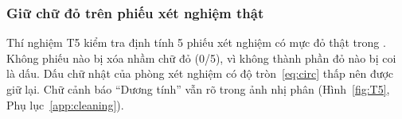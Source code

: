 \subsubsection{Giữ chữ đỏ trên phiếu xét nghiệm thật}
Thí nghiệm T5 kiểm tra định tính 5 phiếu xét nghiệm có mực đỏ thật trong .
Không phiếu nào bị xóa nhầm chữ đỏ (0/5), vì không thành phần đỏ nào bị coi là dấu.
Dấu chữ nhật của phòng xét nghiệm có độ tròn~\eqref{eq:circ} thấp nên được giữ lại.
Chữ cảnh báo ``Dương tính'' vẫn rõ trong ảnh nhị phân (Hình~\ref{fig:T5}, Phụ lục~\ref{app:cleaning}).
